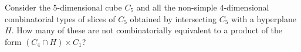 Consider the $5$-dimensional cube $C_5$ and all the non-simple $4$-dimensional combinatorial types of slices of $C_5$ obtained by intersecting $C_5$ with a hyperplane $H$. How many of these are not combinatorially equivalent to a product of the form $(C_4 \cap H) \times C_1$?
